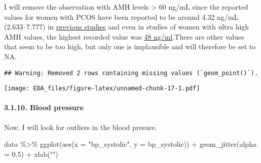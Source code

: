 \documentclass[
]{article}
\newenvironment{Shaded}{\begin{snugshade}}{\end{snugshade}}
\newcommand{\AttributeTok}[1]{\textcolor[rgb]{0.77,0.63,0.00}{#1}}
\newcommand{\CommentTok}[1]{\textcolor[rgb]{0.56,0.35,0.01}{\textit{#1}}}
\newcommand{\ConstantTok}[1]{\textcolor[rgb]{0.00,0.00,0.00}{#1}}
\newcommand{\DecValTok}[1]{\textcolor[rgb]{0.00,0.00,0.81}{#1}}
\newcommand{\FloatTok}[1]{\textcolor[rgb]{0.00,0.00,0.81}{#1}}
\newcommand{\FunctionTok}[1]{\textcolor[rgb]{0.00,0.00,0.00}{#1}}
\newcommand{\NormalTok}[1]{#1}
\newcommand{\OtherTok}[1]{\textcolor[rgb]{0.56,0.35,0.01}{#1}}
\newcommand{\SpecialCharTok}[1]{\textcolor[rgb]{0.00,0.00,0.00}{#1}}
\newcommand{\StringTok}[1]{\textcolor[rgb]{0.31,0.60,0.02}{#1}}
\begin{document}
I will remove the observation with AMH levels \textgreater{} 60 ng/mL
since the reported values for women with PCOS have been reported to be
around 4.32 ng/mL (2.633--7.777) in
\href{https://www.ncbi.nlm.nih.gov/pmc/articles/PMC5895547/}{previous
studies} and even in studies of women with ultra high AMH values, the
highest recorded value was
\href{https://doi.org/10.1016/j.fertnstert.2013.07.1610}{48 ng/ml}.There
are other values that seem to be too high, but only one is implausible
and will therefore be set to NA.

\begin{Shaded}
\end{Shaded}

\begin{verbatim}
## Warning: Removed 2 rows containing missing values (`geom_point()`).
\end{verbatim}

\texttt{[image: EDA\_files/figure-latex/unnamed-chunk-17-1.pdf]}

\hypertarget{blood-pressure}{%
\paragraph{3.1.10. Blood pressure}\label{blood-pressure}}

Now, I will look for outliers in the blood presure.

\begin{Shaded}
\begin{Highlighting}[]
\NormalTok{data }\SpecialCharTok{\%\textgreater{}\%} 
  \FunctionTok{ggplot}\NormalTok{(}\FunctionTok{aes}\NormalTok{(}\AttributeTok{x =} \StringTok{"bp\_systolic"}\NormalTok{, }\AttributeTok{y =}\NormalTok{ bp\_systolic)) }\SpecialCharTok{+}
  \FunctionTok{geom\_jitter}\NormalTok{(}\AttributeTok{alpha =} \FloatTok{0.5}\NormalTok{) }\SpecialCharTok{+}
  \FunctionTok{xlab}\NormalTok{(}\StringTok{""}\NormalTok{)}
\end{Highlighting}
\end{Shaded}
\end{document}
